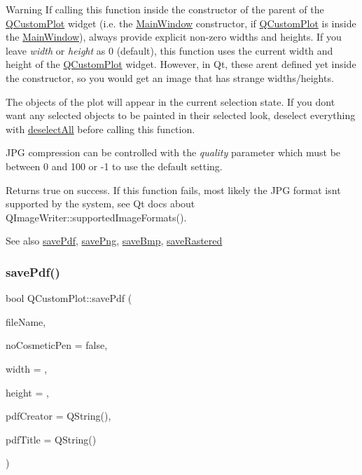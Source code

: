 \begin{DoxyWarning}{Warning}
If calling this function inside the constructor of the parent of the \hyperlink{class_q_custom_plot}{Q\+Custom\+Plot} widget (i.\+e. the \hyperlink{class_main_window}{Main\+Window} constructor, if \hyperlink{class_q_custom_plot}{Q\+Custom\+Plot} is inside the \hyperlink{class_main_window}{Main\+Window}), always provide explicit non-\/zero widths and heights. If you leave {\itshape width} or {\itshape height} as 0 (default), this function uses the current width and height of the \hyperlink{class_q_custom_plot}{Q\+Custom\+Plot} widget. However, in Qt, these aren\textquotesingle{}t defined yet inside the constructor, so you would get an image that has strange widths/heights.
\end{DoxyWarning}
The objects of the plot will appear in the current selection state. If you don\textquotesingle{}t want any selected objects to be painted in their selected look, deselect everything with \hyperlink{class_q_custom_plot_a9d4808ab925b003054085246c92a257c}{deselect\+All} before calling this function.

J\+PG compression can be controlled with the {\itshape quality} parameter which must be between 0 and 100 or -\/1 to use the default setting.

Returns true on success. If this function fails, most likely the J\+PG format isn\textquotesingle{}t supported by the system, see Qt docs about Q\+Image\+Writer\+::supported\+Image\+Formats().

\begin{DoxySeeAlso}{See also}
\hyperlink{class_q_custom_plot_a632da44c6d94ea8b271eb483b08b5114}{save\+Pdf}, \hyperlink{class_q_custom_plot_a7636261aff1f6d25c9da749ece3fc8b8}{save\+Png}, \hyperlink{class_q_custom_plot_a6629d9e8e6da4bf18055ee0257fdce9a}{save\+Bmp}, \hyperlink{class_q_custom_plot_ab528b84cf92baabe29b1d0ef2f77c93e}{save\+Rastered} 
\end{DoxySeeAlso}
\hypertarget{class_q_custom_plot_a632da44c6d94ea8b271eb483b08b5114}{}\label{class_q_custom_plot_a632da44c6d94ea8b271eb483b08b5114} 
\subsubsection{\texorpdfstring{save\+Pdf()}{savePdf()}}
{\footnotesize\ttfamily bool Q\+Custom\+Plot\+::save\+Pdf (\begin{DoxyParamCaption}\item[{const Q\+String \&}]{file\+Name,  }\item[{bool}]{no\+Cosmetic\+Pen = {\ttfamily false},  }\item[{int}]{width = {},  }\item[{int}]{height = {},  }\item[{const Q\+String \&}]{pdf\+Creator = {\ttfamily QString()},  }\item[{const Q\+String \&}]{pdf\+Title = {\ttfamily QString()} }\end{DoxyParamCaption})}

